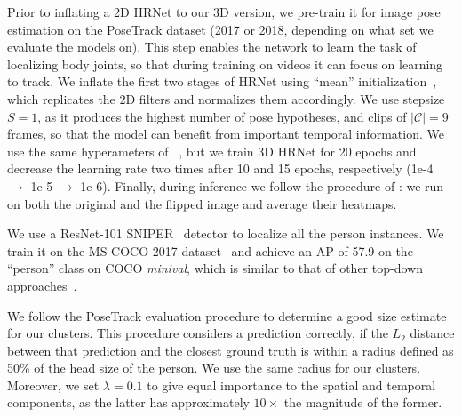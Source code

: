 \documentclass[10pt,twocolumn,letterpaper]{article}
\begin{document}
Prior to inflating a 2D HRNet to our 3D version, we pre-train it for image pose estimation on the PoseTrack dataset (2017 or 2018, depending on what set we evaluate the models on). This step enables the network to learn the task of localizing body joints, so that during training on videos it can focus on learning to track. We inflate the first two stages of HRNet using ``mean'' initialization~\cite{carreira2017quo, feichtenhofer2016spatiotemporal, girdhar2018detecttrack}, which replicates the 2D filters and normalizes them accordingly. We use stepsize $S=1$, as it produces the highest number of pose hypotheses, and clips of $|\mathcal{C}|=9$ frames, so that the model can benefit from important temporal information. 
We use the same hyperameters of ~\cite{sun2019deep}, but we train 3D HRNet for 20 epochs and decrease the learning rate two times after 10 and 15 epochs, respectively (1e-4 $\rightarrow$ 1e-5 $\rightarrow$ 1e-6). Finally, during inference we follow the procedure of \cite{sun2019deep, xiao2018simple}: we run on both the original and the flipped image and average their heatmaps. 


 We use a ResNet-101 SNIPER~\cite{singh18nips} detector to localize all the person instances. We train it on the MS COCO 2017 dataset~\cite{lin2014microsoft} and achieve an AP of 57.9 on the ``person'' class on COCO {\it minival}, which is similar to that of other top-down approaches~\cite{xiao2018simple,yu2018multi}.

 We follow the PoseTrack evaluation procedure to determine a good size estimate for our clusters. This procedure considers a prediction correctly, if the $L_2$ distance between that prediction and the closest ground truth is within a radius defined as 50\% of the head size of the person. We use the same radius for our clusters. Moreover, we set $\lambda=0.1$ to give equal importance to the spatial and temporal components, as the latter has approximately $10\times$ the magnitude of the former.
\end{document}
